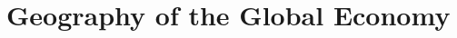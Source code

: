 \documentclass[../main]{subfiles}
\begin{document}
\section{Geography of the Global Economy}
\end{document}
